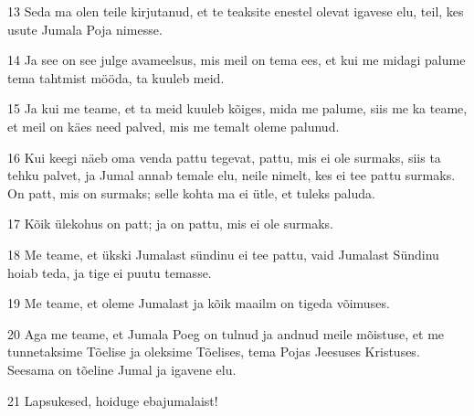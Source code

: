 \par 13 Seda ma olen teile kirjutanud, et te teaksite enestel olevat igavese elu, teil, kes usute Jumala Poja nimesse.
\par 14 Ja see on see julge avameelsus, mis meil on tema ees, et kui me midagi palume tema tahtmist mööda, ta kuuleb meid.
\par 15 Ja kui me teame, et ta meid kuuleb kõiges, mida me palume, siis me ka teame, et meil on käes need palved, mis me temalt oleme palunud.
\par 16 Kui keegi näeb oma venda pattu tegevat, pattu, mis ei ole surmaks, siis ta tehku palvet, ja Jumal annab temale elu, neile nimelt, kes ei tee pattu surmaks. On patt, mis on surmaks; selle kohta ma ei ütle, et tuleks paluda.
\par 17 Kõik ülekohus on patt; ja on pattu, mis ei ole surmaks.
\par 18 Me teame, et ükski Jumalast sündinu ei tee pattu, vaid Jumalast Sündinu hoiab teda, ja tige ei puutu temasse.
\par 19 Me teame, et oleme Jumalast ja kõik maailm on tigeda võimuses.
\par 20 Aga me teame, et Jumala Poeg on tulnud ja andnud meile mõistuse, et me tunnetaksime Tõelise ja oleksime Tõelises, tema Pojas Jeesuses Kristuses. Seesama on tõeline Jumal ja igavene elu.
\par 21 Lapsukesed, hoiduge ebajumalaist!





